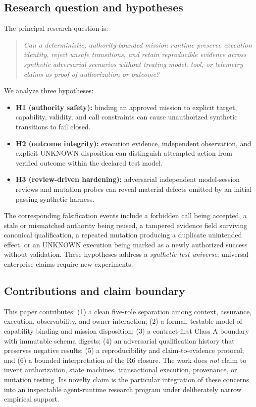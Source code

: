 \documentclass[11pt,twocolumn]{article}
\begin{document}
\subsection{Research question and hypotheses}
The principal research question is:
\begin{quote}\small\emph{Can a deterministic, authority-bounded mission runtime preserve execution identity, reject unsafe transitions, and retain reproducible evidence across synthetic adversarial scenarios without treating model, tool, or telemetry claims as proof of authorization or outcome?}\end{quote}
We analyze three hypotheses:
\begin{itemize}
\item \textbf{H1 (authority safety):} binding an approved mission to explicit target, capability, validity, and call constraints can cause unauthorized synthetic transitions to fail closed.
\item \textbf{H2 (outcome integrity):} execution evidence, independent observation, and explicit UNKNOWN disposition can distinguish attempted action from verified outcome within the declared test model.
\item \textbf{H3 (review-driven hardening):} adversarial independent model-session reviews and mutation probes can reveal material defects omitted by an initial passing synthetic harness.
\end{itemize}
The corresponding falsification events include a forbidden call being accepted, a stale or mismatched authority being reused, a tampered evidence field surviving canonical qualification, a repeated mutation producing a duplicate unintended effect, or an UNKNOWN execution being marked as a newly authorized success without validation. These hypotheses address a \emph{synthetic test universe}; universal enterprise claims require new experiments.

\subsection{Contributions and claim boundary}
This paper contributes: (1) a clean five-role separation among context, assurance, execution, observability, and owner interaction; (2) a formal, testable model of capability binding and mission disposition; (3) a contract-first Class A boundary with immutable schema digests; (4) an adversarial qualification history that preserves negative results; (5) a reproducibility and claim-to-evidence protocol; and (6) a bounded interpretation of the R6 closure. The work does \emph{not} claim to invent authorization, state machines, transactional execution, provenance, or mutation testing. Its novelty claim is the particular integration of these concerns into an inspectable agent-runtime research program under deliberately narrow empirical support.
\end{document}
